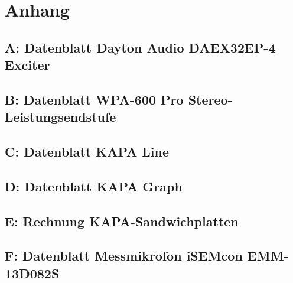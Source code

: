 \appendix
\chapter*{Anhang}

\section*{A: Datenblatt Dayton Audio DAEX32EP-4 Exciter}
\label{sec:anhang_dayton}


\section*{B: Datenblatt WPA-600 Pro Stereo-Leistungsendstufe}
\label{sec:anhang_wpa600}


\section*{C: Datenblatt KAPA Line}
\label{sec:anhang_kapa_line}


\section*{D: Datenblatt KAPA Graph}
\label{sec:anhang_kapa_graph}


\section*{E: Rechnung KAPA-Sandwichplatten}
\label{sec:anhang_rechnung}


\section*{F: Datenblatt Messmikrofon iSEMcon EMM-13D082S}
\label{sec:anhang_messmikrofon}


